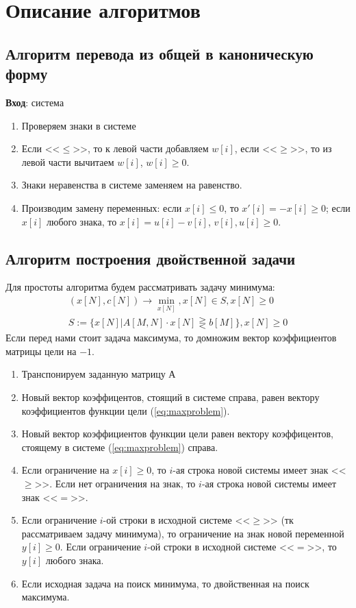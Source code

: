 \documentclass[main.tex]{subfiles}
\begin{document}
\newpage
\section{Описание алгоритмов}
\subsection{Алгоритм перевода из общей в каноническую форму}
\textbf{Вход}: система
\begin{enumerate}
\item Проверяем знаки в системе
\item Если <<$\le$>>, то к левой части добавляем $w[i]$, если <<$\ge$>>, то из левой части вычитаем $w[i]$, $w[i]\ge0$.
\item Знаки неравенства в системе заменяем на равенство.
\item Производим замену переменных: если $x[i]\le0$, то $x'[i]=-x[i]\ge0$; если $x[i]$ любого знака, то $x[i]=u[i]-v[i]$, $v[i],u[i] \ge 0$.
\end{enumerate}
\subsection{Алгоритм построения двойственной задачи}
Для простоты алгоритма будем рассматривать задачу минимума:
\begin{equation}\label{eq:maxproblem}
\begin{array}{ll}
(x[N],c[N])\longrightarrow \min_{x[N]}, x[N] \in S, x[N] \ge 0\\
S :=\{x[N]|A[M,N]\cdot x[N] \gtreqless b[M]\}, x[N] \ge 0
\end{array}
\end{equation}
Если перед нами стоит задача максимума, то домножим вектор коэффициентов матрицы цели на $-1$.
\begin{enumerate}
\item Транспонируем заданную матрицу $А$
\item Новый вектор коэффицентов, стоящий в системе справа, равен вектору коэффициентов функции цели (\ref{eq:maxproblem}).
\item Новый вектор коэффициентов функции цели равен вектору коэффицентов, стоящему в системе (\ref{eq:maxproblem}) справа.
\item Если ограничение на $x[i]\ge0$, то $i$-ая строка новой системы имеет знак <<$\ge$>>.
Если нет ограничения на знак, то $i$-ая строка новой системы имеет знак <<$=$>>.
\item Если ограничение $i$-ой строки в исходной системе <<$\ge$>> (тк рассматриваем задачу  минимума), то ограничение на знак новой переменной $y[i]\ge0$.
Если ограничение $i$-ой строки в исходной системе <<$=$>>, то $y[i]$ любого знака.
\item Если исходная задача на поиск минимума, то двойственная на поиск максимума.
\end{enumerate}
\end{document}
